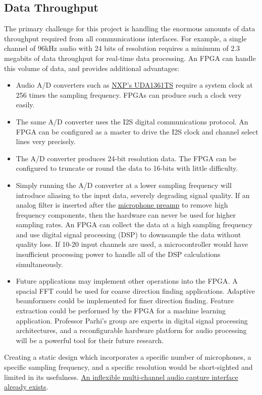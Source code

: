 \documentclass[10pt]{article}
\begin{document}
\subsection{Data Throughput}
The primary challenge for this project is handling the enormous amounts of data throughput required from all communications interfaces.  For example, a single channel of 96kHz audio with 24 bits of resolution requires a minimum of 2.3 megabits of data throughput for real-time data processing.  An FPGA can handle this volume of data, and provides additional advantages:
\begin{itemize}
\item
Audio A/D converters such as \href{http://www.nxp.com/documents/data\_sheet/UDA1361TS.pdf}{NXP's UDA1361TS} require a system clock at 256 times the sampling frequency.  FPGAs can produce such a clock very easily.
\item
The same A/D converter uses the I2S digital communications protocol.  An FPGA can be configured as a master to drive the I2S clock and channel select lines very precisely.
\item
The A/D converter produces 24-bit resolution data.  The FPGA can be configured to truncate or round the data to 16-bits with little difficulty.
\item
Simply running the A/D converter at a lower sampling frequency will introduce aliasing to the input data, severely degrading signal quality.  If an analog filter is inserted after the \href{http://datasheets.maxim-ic.com/en/ds/MAX9812-MAX9813L.pdf}{microphone preamp} to remove high frequency components, then the hardware can never be used for higher sampling rates.  An FPGA can collect the data at a high sampling frequency and use digital signal processing (DSP) to downsample the data without quality loss.  If 10-20 input channels are used, a microcontroller would have insufficient processing power to handle all of the DSP calculations simultaneously.
\item
Future applications may implement other operations into the FPGA.  A spacial FFT could be used for coarse direction finding applications.  Adaptive beamformers could be implemented for finer direction finding.  Feature extraction could be performed by the FPGA for a machine learning application.  Professor Parhi's group are experts in digital signal processing architectures, and a reconfigurable hardware platform for audio processing will be a powerful tool for their future research.
\end{itemize}
Creating a static design which incorporates a specific number of microphones, a specific sampling frequency, and a specific resolution would be short-sighted and limited in its usefulness.  \href{http://introlab.gel.usherbrooke.ca/mediawiki-introlab/index.php/8SoundsUSB}{An inflexible multi-channel audio capture interface already exists}.
\end{document}
